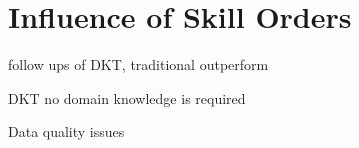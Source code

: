 \section{Influence of Skill Orders}


follow ups of DKT, traditional outperform

DKT no domain knowledge is required

Data quality issues

